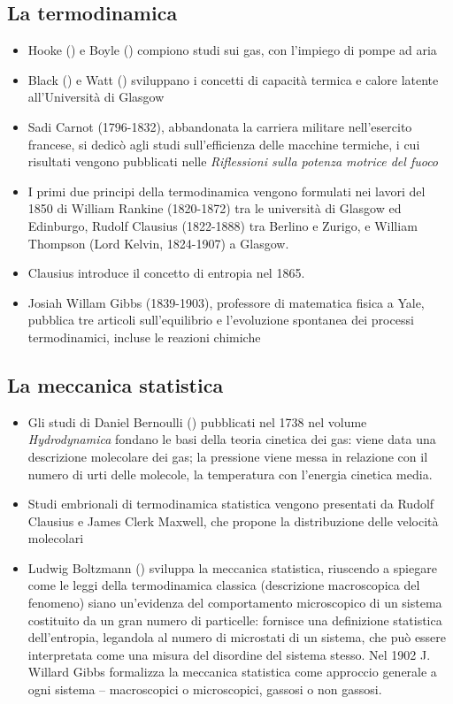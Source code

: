 \subsection{La termodinamica}
\begin{itemize}
    \item Hooke () e Boyle () compiono studi sui gas, con l'impiego di pompe ad aria
    \item Black () e Watt () sviluppano i concetti di capacità termica e calore latente all'Università di Glasgow
    \item Sadi Carnot (1796-1832), abbandonata la carriera militare nell'esercito francese, si dedicò agli studi sull'efficienza delle macchine termiche, i cui risultati vengono pubblicati nelle \textit{Riflessioni sulla potenza motrice del fuoco}
    \item I primi due principi della termodinamica vengono formulati nei lavori del 1850 di William Rankine (1820-1872) tra le università di Glasgow ed Edinburgo, Rudolf Clausius (1822-1888) tra Berlino e Zurigo, e William Thompson (Lord Kelvin, 1824-1907) a Glasgow.
    \item Clausius introduce il concetto di entropia nel 1865.
    \item Josiah Willam Gibbs (1839-1903), professore di matematica fisica a Yale, pubblica tre articoli sull'equilibrio e l'evoluzione spontanea dei processi termodinamici, incluse le reazioni chimiche
\end{itemize}
\subsection{La meccanica statistica}
\begin{itemize}
    \item Gli studi di Daniel Bernoulli () pubblicati nel 1738 nel volume \textit{Hydrodynamica} fondano le basi della teoria cinetica dei gas: viene data una descrizione molecolare dei gas; la pressione viene messa in relazione con il numero di urti delle molecole, la temperatura con l'energia cinetica media.
    \item Studi embrionali di termodinamica statistica vengono presentati da Rudolf Clausius e James Clerk Maxwell, che propone la distribuzione delle velocità molecolari
    \item Ludwig Boltzmann () sviluppa la meccanica statistica, riuscendo a spiegare come le leggi della termodinamica classica (descrizione macroscopica del fenomeno) siano un'evidenza del comportamento microscopico di un sistema costituito da un gran numero di particelle: fornisce una definizione statistica dell'entropia, legandola al numero di microstati di un sistema, che può essere interpretata come una misura del disordine del sistema stesso. Nel 1902 J. Willard Gibbs formalizza la meccanica statistica come approccio generale a ogni sistema -- macroscopici o microscopici, gassosi o non gassosi.
\end{itemize}

